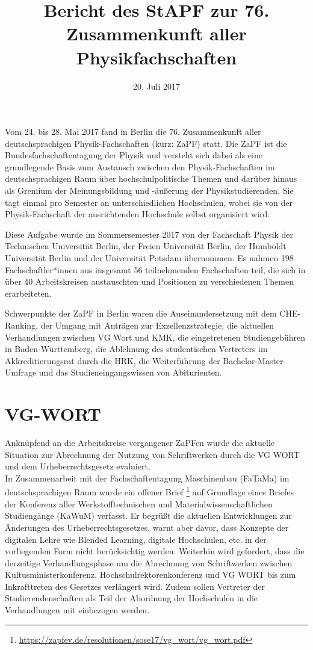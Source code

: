 \documentclass[a4paper]{article}
\begin{document}
\title{Bericht des StAPF zur 76. Zusammenkunft aller Physikfachschaften}
\date{20. Juli 2017}

\maketitle

Vom 24. bis 28. Mai 2017 fand in Berlin die 76. Zusammenkunft
aller deutschsprachigen Physik-Fachschaften (kurz: ZaPF) statt.  Die ZaPF ist
die Bundesfachschaftentagung der Physik und versteht sich dabei als eine
grundlegende Basis zum Austausch zwischen den Physik-Fachschaften im
deutschsprachigen Raum über hochschulpolitische Themen und darüber hinaus als
Gremium der Meinungsbildung und -äußerung der Physikstudierenden. Sie tagt
einmal pro Semester an unterschiedlichen Hochschulen, wobei sie von der
Physik-Fachschaft der ausrichtenden Hochschule selbst organisiert wird. 

Diese Aufgabe wurde im Sommersemester 2017 von der Fachschaft Physik der
Technischen Universität Berlin, der Freien Universität Berlin, der Humboldt
Universität Berlin und der Universität Potsdam übernommen.  Es nahmen 198
Fachschaftler*innen aus insgesamt 56 teilnehmenden Fachschaften teil, die sich
in über 40 Arbeitskreisen austauschten und Positionen zu verschiedenen Themen
erarbeiteten.

Schwerpunkte der ZaPF in Berlin waren die Auseinandersetzung mit dem
CHE-Ranking, der Umgang mit Anträgen zur Exzellenzstrategie, die aktuellen
Verhandlungen zwischen VG Wort und KMK, die eingetretenen Studiengebühren in
Baden-Württemberg, die Ablehnung des studentischen Vertreters im
Akkreditierungsrat durch die HRK, die Weiterführung der Bachelor-Master-Umfrage
und das Studieneingangswissen von Abiturienten.

\newpage

\section*{VG-WORT}
Anknüpfend an die Arbeitskreise vergangener ZaPFen wurde die
aktuelle Situation zur Abrechnung der Nutzung von Schriftwerken durch die VG
WORT und dem Urheberrechtsgesetz evaluiert. \\
In Zusammenarbeit mit der Fachschaftentagung Maschinenbau (FaTaMa) im
deutschsprachigen Raum wurde ein offener Brief
\footnote{\href{https://zapfev.de/resolutionen/sose17/vg_wort/vg_wort.pdf}{\url{https://zapfev.de/resolutionen/sose17/vg_wort/vg_wort.pdf}}}
auf Grundlage eines Briefes der Konferenz aller Werkstofftechnischen und
Materialwissenschaftlichen Studiengänge (KaWuM) verfasst. Er begrüßt die
aktuellen Entwicklungen zur Änderungen des Urheberrechtsgesetzes, warnt aber
davor, dass Konzepte der digitalen Lehre wie Blended Learning, digitale
Hochschulen, etc. in der vorliegenden Form nicht berücksichtig werden.
Weiterhin wird gefordert, dass die derzeitige Verhandlungsphase um die
Abrechnung von Schriftwerken zwischen Kultusministerkonferenz,
Hochschulrektorenkonferenz und VG WORT bis zum Inkrafttreten des Gesetzes
verlängert wird. Zudem sollen Vertreter der Studierendenschaften als Teil der
Abordnung der Hochschulen in die Verhandlungen mit einbezogen werden.
\end{document}
